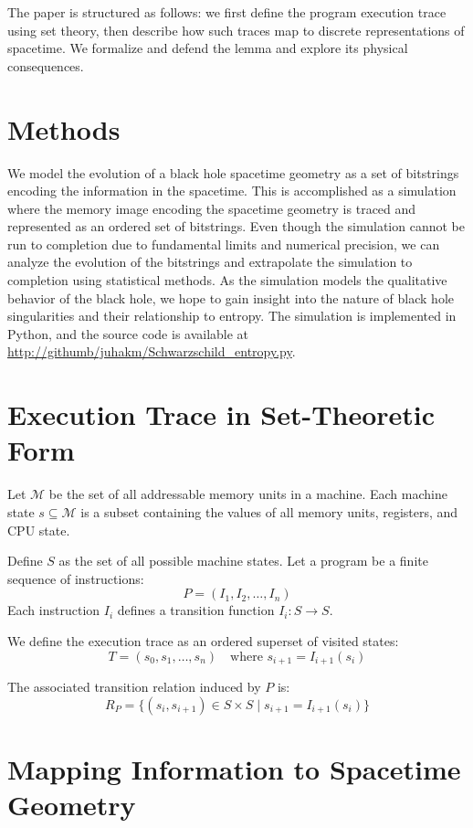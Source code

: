 \documentclass[11pt]{article}
\begin{document}
The paper is structured as follows: we first define the program execution trace using set theory, then describe how such traces map to discrete representations of spacetime. We formalize and defend the lemma and explore its physical consequences.

\section{Methods}

We model the evolution of a black hole spacetime geometry as a set of bitstrings encoding the information in the spacetime. This is accomplished as a simulation where the memory image encoding the spacetime geometry is traced and represented as an ordered set of bitstrings. Even though the simulation cannot be run to  completion due to  fundamental limits and numerical precision, we can analyze the evolution of the bitstrings and extrapolate the simulation to completion using statistical methods. As the simulation
models the qualitative behavior of the black hole, we hope to gain insight into the nature of black hole singularities and their relationship to entropy.
The simulation is implemented in Python, and the source code is available at \url{http://githumb/juhakm/Schwarzschild\_entropy.py}.


\section{Execution Trace in Set-Theoretic Form}

Let $\mathcal{M}$ be the set of all addressable memory units in a machine. Each machine state $s \subseteq \mathcal{M}$ is a subset containing the values of all memory units, registers, and CPU state.

Define $S$ as the set of all possible machine states. Let a program be a finite sequence of instructions:
\[
  P = (I_1, I_2, \dots, I_n)
\]
Each instruction $I_i$ defines a transition function $I_i : S \to S$.

We define the execution trace as an ordered superset of visited states:
\[
  T = (s_0, s_1, \dots, s_n) \quad \text{where } s_{i+1} = I_{i+1}(s_i)
\]

The associated transition relation induced by $P$ is:
\[
  R_P = \{ (s_i, s_{i+1}) \in S \times S \mid s_{i+1} = I_{i+1}(s_i) \}
\]

\section{Mapping Information to Spacetime Geometry}
\end{document}
